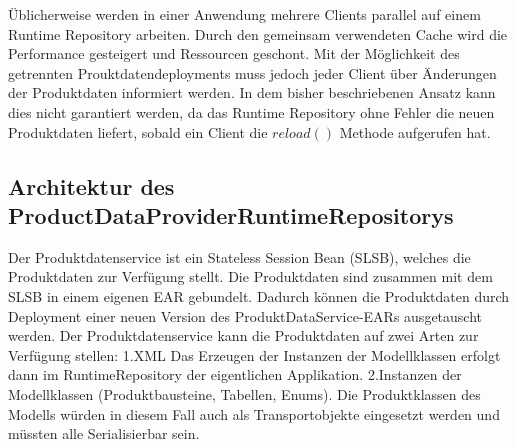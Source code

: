 \documentclass[headsepline=true, footsepline=true]{scrartcl}
\begin{document}
Üblicherweise werden in einer Anwendung mehrere Clients parallel auf einem
Runtime Repository arbeiten. Durch den gemeinsam verwendeten Cache wird die
Performance gesteigert und Ressourcen geschont. Mit der Möglichkeit des
getrennten Prouktdatendeployments muss jedoch jeder Client über Änderungen der
Produktdaten informiert werden. In dem bisher beschriebenen Ansatz kann dies
nicht garantiert werden, da das Runtime Repository ohne Fehler die neuen
Produktdaten liefert, sobald ein Client die $reload()$ Methode aufgerufen hat.






\subsection{Architektur des ProductDataProviderRuntimeRepositorys}



Der Produktdatenservice ist ein Stateless
Session Bean (SLSB), welches die Produktdaten zur Verfügung stellt. Die
Produktdaten sind zusammen mit dem SLSB in einem eigenen EAR gebundelt. Dadurch
können die Produktdaten durch Deployment einer neuen Version des
ProduktDataService-EARs ausgetauscht werden. Der Produktdatenservice kann die
Produktdaten auf zwei Arten zur Verfügung stellen: 1.XML Das Erzeugen der
Instanzen der Modellklassen erfolgt dann im RuntimeRepository der eigentlichen
Applikation. 2.Instanzen der Modellklassen (Produktbausteine, Tabellen, Enums).
Die Produktklassen des Modells würden in diesem Fall auch als Transportobjekte
eingesetzt werden und müssten alle Serialisierbar sein.
\end{document}

